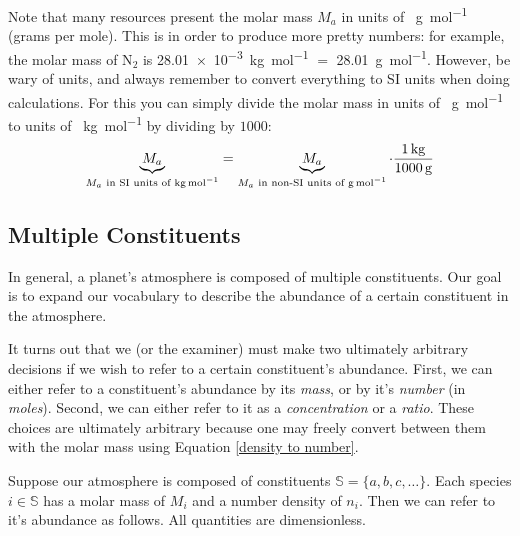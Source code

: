 Note that many resources present the molar mass $M_a$ in units of \qty{}{\gram\per\mole} (grams per mole). This is in order to produce more pretty numbers: for example, the molar mass of N$_2$ is \qty{28.01e-3}{\kilogram\per\mole} $=$ \qty{28.01}{\gram\per\mole}. However, be wary of units, and always remember to convert everything to SI units when doing calculations. For this you can simply divide the molar mass in units of \qty{}{\gram\per\mole} to units of \qty{}{\kilogram\per\mole} by dividing by $1000$:
\begin{align*}
    \underbrace{M_a}_{M_a\text{ in SI units of \qty{}{\kilogram\per\mole}}} = \underbrace{M_a}_{M_a\text{ in non-SI units of \qty{}{\gram\per\mole}}}\cdot\frac{\qty{1}{\kilogram}}{\qty{1000}{\gram}}
\end{align*}

\subsection{Multiple Constituents}\label{Multiple}

In general, a planet's atmosphere is composed of multiple constituents. Our goal is to expand our vocabulary to describe the abundance of a certain constituent in the atmosphere.

It turns out that we (or the examiner) must make two ultimately arbitrary decisions if we wish to refer to a certain constituent's abundance. First, we can either refer to a constituent's abundance by its \textit{mass}, or by it's \textit{number} (in \textit{moles}). Second, we can either refer to it as a \textit{concentration} or a \textit{ratio}. These choices are ultimately arbitrary because one may freely convert between them with the molar mass using Equation \ref{density to number}.

Suppose our atmosphere is composed of constituents  $\mathbb{S}=\{a,b,c,\ldots\}$. Each species $i\in\mathbb{S}$ has a molar mass of $M_i$ and a number density of $n_i$. Then we can refer to it's abundance as follows. All quantities are dimensionless.

